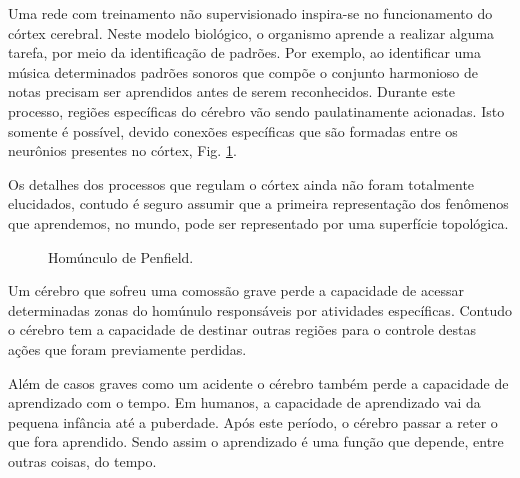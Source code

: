 Uma rede com treinamento não supervisionado inspira-se no funcionamento do córtex cerebral. Neste modelo biológico, o organismo aprende a realizar alguma tarefa, por meio da identificação de padrões. Por exemplo, ao identificar uma música determinados padrões sonoros que compõe o conjunto harmonioso de notas precisam ser aprendidos antes de serem reconhecidos. Durante este processo, regiões específicas do cérebro vão sendo paulatinamente acionadas. Isto somente é possível, devido conexões específicas que são formadas entre os neurônios
presentes no córtex, Fig. \ref{homunculo}.

Os detalhes dos processos que regulam o córtex ainda não foram totalmente elucidados, contudo é seguro assumir que a primeira representação dos fenômenos que aprendemos, no mundo, pode ser representado por uma superfície topológica.  

\begin{figure}[H]
	\centering
	\setlength{\fboxsep}{8pt}
	\setlength{\fboxrule}{0.1pt}
	\caption{Homúnculo de Penfield.}
	\label{homunculo}
\end{figure}

Um cérebro que sofreu uma comossão grave perde a capacidade de acessar
determinadas zonas do homúnulo responsáveis por atividades específicas. Contudo
o cérebro tem a capacidade de destinar outras regiões para o controle destas
ações que foram previamente perdidas.

Além de casos graves como um acidente o cérebro também perde a capacidade de
aprendizado com o tempo. Em humanos, a capacidade de aprendizado vai da pequena
infância até a puberdade. Após este período, o cérebro passar a reter o que fora
aprendido. Sendo assim o aprendizado é uma função que depende, entre outras
coisas, do tempo.

